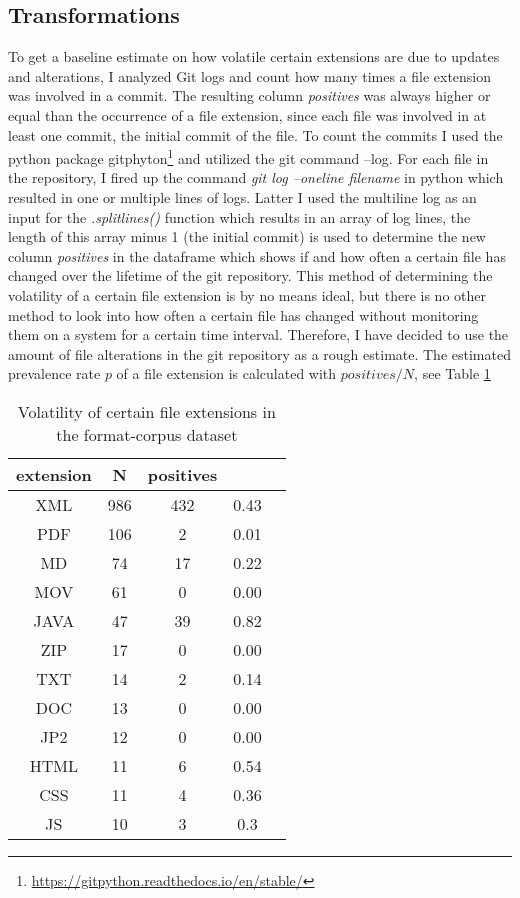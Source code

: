 \subsection{Transformations}
To get a baseline estimate on how volatile certain extensions are due to updates and alterations, I analyzed Git logs and count how many times a file extension was involved in a commit. The resulting column \textit{positives} was always higher or equal than the occurrence of a file extension, since each file was involved in at least one commit, the initial commit of the file. To count the commits I used the python package gitphyton\footnote{\url{https://gitpython.readthedocs.io/en/stable/}} and utilized the git command --log. For each file in the repository, I fired up the command \textit{git log --oneline filename} in python which resulted in one or multiple lines of logs. Latter I used the multiline log as an input for the \textit{.splitlines()} function which results in an array of log lines, the length of this array minus 1 (the initial commit) is used to determine the new column \textit{positives} in the dataframe which shows if and how often a certain file has changed over the lifetime of the git repository. 
This method of determining the volatility of a certain file extension is by no means ideal, but there is no other method to look into how often a certain file has changed without monitoring them on a system for a certain time interval. Therefore, I have decided to use the amount of file alterations in the git repository as a rough estimate.
The estimated prevalence rate $p$ of a file extension is calculated with $positives/N$, see Table \ref{tb:git-alterations}
\begin{table}[ht]
    \caption{Volatility of certain file extensions in the format-corpus dataset}
    \centering
    \begin{tabular}{ c c c c c}
    \label{tb:git-alterations}
     extension & N & positives\\ 
     \hline
     XML & 986 & 432 & 0.43  \\
     \hline
     PDF &106 &2 &0.01  \\
     \hline
     MD & 74 & 17 & 0.22  \\   
     \hline
     MOV&61 & 0 & 0.00 \\ 
     \hline
     JAVA &47 &39&0.82 \\ 
     \hline
     ZIP & 17 &0 &0.00 \\
     \hline
     TXT & 14 & 2 & 0.14 \\
     \hline
     DOC & 13 & 0 & 0.00 \\ 
     \hline
     JP2 & 12 & 0 & 0.00 \\  
     \hline
     HTML & 11 & 6 & 0.54 \\ 
     \hline
     CSS & 11 & 4 & 0.36 \\
     \hline
     JS & 10 & 3 & 0.3 \\
    \end{tabular}
\end{table}
